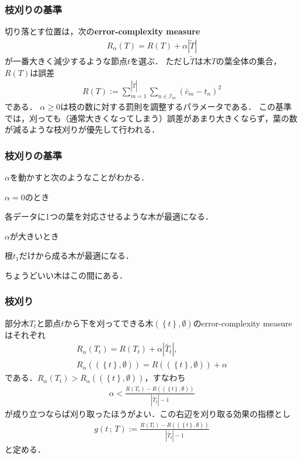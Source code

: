 \documentclass[10pt,hyperref={unicode}]{beamer}
\newenvironment{wideitemize}{\itemize\addtolength{\itemsep}{1em}}{\enditemize}
\newcommand{\absolute}[1]{\left|#1\right|}
\newcommand{\parentheses}[1]{\left(#1\right)}
\newcommand{\braces}[1]{\left\{#1\right\}}
\begin{document}
\begin{frame}
\frametitle{枝刈りの基準}
切り落とす位置は，次の\textbf{error-complexity measure}
\begin{align*}
    R_\alpha \parentheses{T} =
    R \parentheses{T} + \alpha \absolute{\widetilde{T}}
\end{align*}
が一番大きく減少するような節点$t$を選ぶ．
ただし$\widetilde{T}$は木$T$の葉全体の集合，
$R\parentheses{T}$は誤差
\begin{align*}
    R\parentheses{T}
    := \sum_{m = 1}^{\absolute{\widetilde{T}}} \sum_{n \in \mathcal{I}_m} \parentheses{\bar{c}_m - t_n}^2
\end{align*}
である．
$\alpha \geq 0$は枝の数に対する罰則を調整するパラメータである．
この基準では，刈っても（通常大きくなってしまう）誤差があまり大きくならず，葉の数が減るような枝刈りが優先して行われる．

\end{frame}

\begin{frame}
\frametitle{枝刈りの基準}
$\alpha$を動かすと次のようなことがわかる．

\bigskip
\begin{wideitemize}
    \item $\alpha = 0$のとき

        各データに1つの葉を対応させるような木が最適になる．

    \item $\alpha$が大きいとき

        根$t_1$だけから成る木が最適になる．
\end{wideitemize}

\bigskip

ちょうどいい木はこの間にある．
\end{frame}

\begin{frame}
\frametitle{枝刈り}
部分木$T_t$と節点$t$から下を刈ってできる木$\parentheses{\braces{t},\emptyset}$のerror-complexity measureはそれぞれ
\begin{gather*}
    R_\alpha\parentheses{T_t} = R\parentheses{T_t} + \alpha \absolute{\widetilde{T_t}}, \\
    R_\alpha\parentheses{\parentheses{\braces{t}, \emptyset}} = R\parentheses{\parentheses{\braces{t}, \emptyset}} + \alpha
\end{gather*}
である．$R_\alpha\parentheses{T_t} > R_\alpha{\parentheses{\parentheses{\braces{t}, \emptyset}}}$，すなわち
\begin{align*}
    \alpha < \frac{R\parentheses{T_t} - R\parentheses{\parentheses{\braces{t}, \emptyset}}}{\absolute{\widetilde{T_t}} - 1}
\end{align*}
が成り立つならば刈り取ったほうがよい．この右辺を刈り取る効果の指標とし
\begin{align*}
    g\parentheses{t\,;\,T} := \frac{R\parentheses{T_t} - R\parentheses{\parentheses{\braces{t}, \emptyset}}}{\absolute{\widetilde{T_t}} - 1}
\end{align*}
と定める．
\end{frame}
\end{document}
